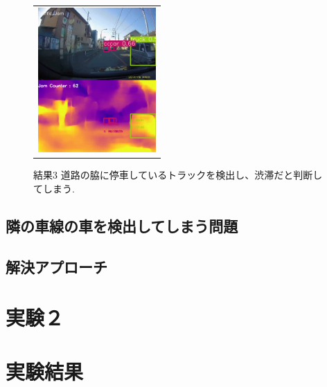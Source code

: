 \begin{figure}[htbp]
\begin{tabular}{c}
  \begin{minipage}{0.33\hsize}
  \begin{center}
    \includegraphics[width=4.5cm]{figs/ex01_01.png}
  \end{center}
  \caption{結果3 道路の脇に停車しているトラックを検出し、渋滞だと判断してしまう.}
  \label{fig:ex01_03}
\end{minipage}
\end{tabular}
\end{figure}


\subsection{隣の車線の車を検出してしまう問題}

\subsection{解決アプローチ}

\section{実験２}

\section{実験結果}


